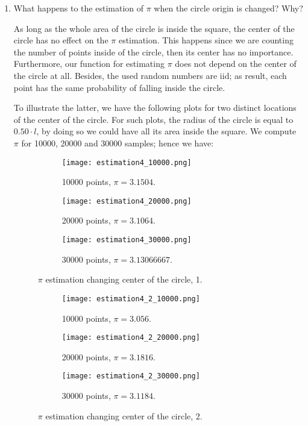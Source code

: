 \documentclass[12pt,letterpaper]{report}
\begin{document}
\begin{enumerate}
		\item What happens to the estimation of $\pi$ when the circle origin is changed? Why?

		As long as the whole area of the circle is inside the square, the center of the circle has no effect on the $\pi$ estimation. This happens since we are counting the number of points inside of the circle, then its center has no importance. Furthermore, our function for estimating $\pi$ does not depend on the center of the circle at all. Besides, the used random numbers are iid; as result, each point has the same probability of falling inside the circle.
		
		To illustrate the latter, we have the following plots for two distinct locations of the center of the circle. For such plots, the radius of the circle is equal to $0.50 \cdot l$, by doing so we could have all its area inside the square. We compute $\pi$ for 10000, 20000 and 30000 samples; hence we have: 
		
		\begin{figure}[H]
		\centering
		\begin{subfigure}[b]{0.32\linewidth}
			\centering
			\texttt{[image: estimation4\_10000.png]}
			\caption{10000 points, $\pi=3.1504$.}
		\end{subfigure}	
		\hfill			
		\begin{subfigure}[b]{0.32\linewidth}
			\centering
			\texttt{[image: estimation4\_20000.png]}
			\caption{20000 points, $\pi = 3.1064$.}
		\end{subfigure}		
		\hfill
		\begin{subfigure}[b]{0.32\linewidth}
			\centering
			\texttt{[image: estimation4\_30000.png]}
			\caption{30000 points, $\pi= 3.13066667$.}
		\end{subfigure}		
		\caption{$\pi$ estimation changing center of the circle, 1.}
		\label{fig::que4_1}
		\end{figure}    	

		\begin{figure}[H]
			\centering
			\begin{subfigure}[b]{0.32\linewidth}
				\centering
				\texttt{[image: estimation4\_2\_10000.png]}
				\caption{10000 points, $\pi=3.056$.}
			\end{subfigure}		
			\hfill
			\begin{subfigure}[b]{0.32\linewidth}
				\centering
				\texttt{[image: estimation4\_2\_20000.png]}
				\caption{20000 points, $\pi = 3.1816$.}
			\end{subfigure}
			\hfill
			\begin{subfigure}[b]{0.32\linewidth}
				\centering
				\texttt{[image: estimation4\_2\_30000.png]}
				\caption{30000 points, $\pi= 3.1184$.}
			\end{subfigure}		
			\caption{$\pi$ estimation changing center of the circle, 2.}
			\label{fig::que4_2}
		\end{figure}    	
						

\end{enumerate}
\end{document}

